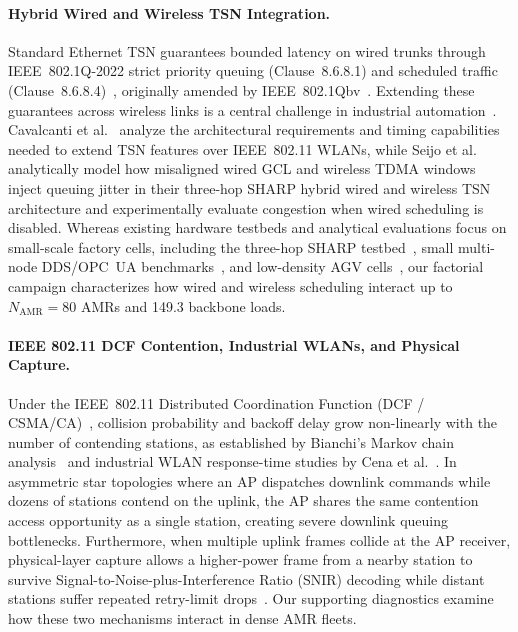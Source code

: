 \documentclass[11pt,a4paper]{article}
\newcommand{\Namr}{\ensuremath{N_{\mathrm{AMR}}}}
\begin{document}
\paragraph{Hybrid Wired and Wireless TSN Integration.}
Standard Ethernet TSN guarantees bounded latency on wired trunks through IEEE~802.1Q-2022 strict priority queuing (Clause~8.6.8.1) and scheduled traffic (Clause~8.6.8.4)~\cite{ieee8021q}, originally amended by IEEE~802.1Qbv~\cite{ieee8021qbv}. Extending these guarantees across wireless links is a central challenge in industrial automation~\cite{zanbouri2025survey}. Cavalcanti et al.~\cite{cavalcanti2019extending} analyze the architectural requirements and timing capabilities needed to extend TSN features over IEEE~802.11 WLANs, while Seijo et al.~\cite{seijo2022sharp} analytically model how misaligned wired GCL and wireless TDMA windows inject queuing jitter in their three-hop SHARP hybrid wired and wireless TSN architecture and experimentally evaluate congestion when wired scheduling is disabled. Whereas existing hardware testbeds and analytical evaluations focus on small-scale factory cells, including the three-hop SHARP testbed~\cite{seijo2022sharp}, small multi-node DDS/OPC~UA benchmarks~\cite{calvo2013dds, maia2020opcua}, and low-density AGV cells~\cite{11511549}, our factorial campaign characterizes how wired and wireless scheduling interact up to $\Namr=80$ AMRs and \qty{149.3}{\mbps} backbone loads.

\paragraph{IEEE 802.11 DCF Contention, Industrial WLANs, and Physical Capture.}
Under the IEEE~802.11 Distributed Coordination Function (DCF / CSMA/CA)~\cite{ieee80211}, collision probability and backoff delay grow non-linearly with the number of contending stations, as established by Bianchi's Markov chain analysis~\cite{bianchi2000performance} and industrial WLAN response-time studies by Cena et al.~\cite{cena2007evaluation}. In asymmetric star topologies where an AP dispatches downlink commands while dozens of stations contend on the uplink, the AP shares the same contention access opportunity as a single station, creating severe downlink queuing bottlenecks. Furthermore, when multiple uplink frames collide at the AP receiver, physical-layer capture allows a higher-power frame from a nearby station to survive Signal-to-Noise-plus-Interference Ratio (SNIR) decoding while distant stations suffer repeated retry-limit drops~\cite{lee2007experimental}. Our supporting diagnostics examine how these two mechanisms interact in dense AMR fleets.
\end{document}
